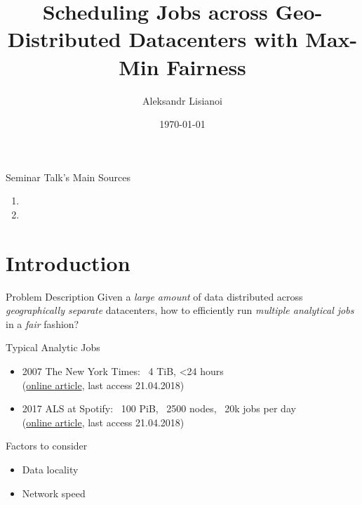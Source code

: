 \documentclass[presentation,professionalfonts]{beamer}
\institute[TU Wien]{Seminar ``\semname''\\\semester}
\date{\today}
\title[Scheduling Jobs with Max-Min Fairness]{Scheduling Jobs across Geo-Distributed Datacenters with Max-Min Fairness}
\author[Aleksandr Lisianoi]{Aleksandr Lisianoi}
\begin{document}
\maketitle

\begin{frame}{Seminar Talk's Main Sources}
  \begin{enumerate}
  \item {}
  \item {}
  \end{enumerate}
\end{frame}



\section{Introduction}

\begin{frame}{Problem Description}
    Given a \emph{large amount} of data distributed across
    \emph{geographically separate} datacenters, how to efficiently run
    \emph{multiple analytical jobs} in a \emph{fair} fashion?
\end{frame}

\begin{frame}{Typical Analytic Jobs}
  \begin{itemize}
  \item 2007 The New York Times: ~4 TiB, <24 hours \\
    (\href{https://open.blogs.nytimes.com/2007/11/01/self-service-prorated-super-computing-fun/}{online article}, last access 21.04.2018)
  \item 2017 ALS at Spotify: ~100 PiB, ~2500 nodes, ~20k jobs per day \\
    (\href{https://labs.spotify.com/2017/10/16/big-data-processing-at-spotify-the-road-to-scio-part-1/}{online article}, last access 21.04.2018)
  \end{itemize}
\end{frame}

\begin{frame}{Factors to consider}
  \begin{itemize}
  \item Data locality
  \item Network speed
  \end{itemize}
\end{frame}
\end{document}
